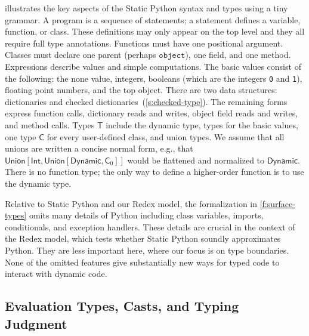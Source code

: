 \documentclass[english,cleveref,submission]{programming}
\newcommand{\SP}{Static Python}
\newcommand{\code}[1]{\texttt{#1}}
\newcommand{\typefont}[1]{\mathsf{#1}}
\newcommand{\paramtype}[2]{#1[#2]}
\newcommand{\sptype}{\typefont{T}}
\newcommand{\sptclass}{\typefont{C}}
\newcommand{\sptint}{\typefont{Int}}
\newcommand{\sptdyn}{\typefont{Dynamic}}
\newcommand{\sptunion}[1]{\paramtype{\typefont{Union}}{#1}}
\newcommand{\spobject}{\code{object}}
\begin{document}
 illustrates the key aspects of the \SP{} syntax and types
using a tiny grammar.
A program is a sequence of statements;
a statement defines a variable, function, or class.
These definitions may only appear on the top level
and they all require full type annotations.
Functions must have one positional argument.
Classes must declare one parent (perhaps $\spobject$), one field, and one method.
Expressions describe values and simple computations.
The basic values consist of the following: the none value, integers,
booleans (which are the integers \code{0} and \code{1}), floating point numbers, and the top object.
There are two data structures: dictionaries and checked dictionaries~(\cref{s:checked-type}).
The remaining forms express function calls, dictionary reads and writes, object field reads and writes,
and method calls.
Types $\sptype$ include the dynamic type, types for the basic values, one type $\sptclass$ for every
user-defined class, and union types.
We assume that all unions are written a concise normal form, e.g., that
$\sptunion{\sptint, \sptunion{\sptdyn, \sptclass_0}}$ would be flattened and normalized to $\sptdyn$.
There is no function type; the only way to define a higher-order function is to use the dynamic type.


Relative to \SP{} and our Redex model, the formalization in \cref{f:surface-types} omits
many details of Python including class variables, imports, conditionals, and exception handlers.
These details are crucial in the context of the Redex model, which tests whether \SP{}
soundly approximates Python.
They are less important here, where our focus is on type boundaries.
None of the omitted features give substantially new ways for typed code to interact with dynamic code.


\subsection{Evaluation Types, Casts, and Typing Judgment}
\end{document}
